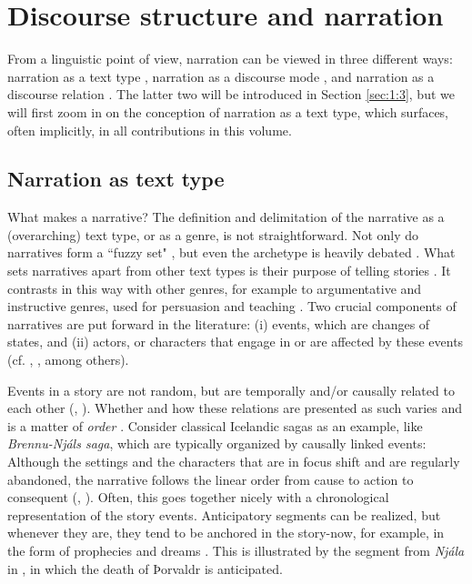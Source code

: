 \documentclass[output=paper,colorlinks,citecolor=brown]{langscibook}
\begin{document}
\section{Discourse structure and narration}
From a linguistic point of view, narration can be viewed in three different ways: narration as a text type \citep{Labov1972}, narration as a discourse mode \citep{Smith2003}, and narration as a discourse relation \citep{AsherLascarides2003}. The latter two will be introduced in Section \ref{sec:1:3}, but we will first zoom in on the conception of narration as a text type, which surfaces, often implicitly, in all contributions in this volume.

\subsection{Narration as text type}\label{sec:1:2}
What makes a narrative? The definition and delimitation of the narrative as a (overarching) text type, or as a genre, is not straightforward. Not only do narratives form a ``fuzzy set" \citep[193]{Ryan2006}, but even the archetype is heavily debated \citep[e.g.,][]{Ryan2017}. What sets narratives apart from other text types is their purpose of telling stories \citep[e.g.,][]{Labov2013}. It contrasts in this way with other genres, for example to argumentative and instructive genres, used for persuasion and teaching \citep{Fludernik2000}. Two crucial components of narratives are put forward in the literature: (i) events, which are changes of states, and (ii) actors, or characters that engage in or are affected by these events (cf. \citealt{Bal1985}, \citealt[56]{virtanen2011}, among others).

Events in a story are not random, but are temporally and/or causally related to each other (\citealt[16--18]{RimmonKenan1983}, \citealt[903]{Sternberg1990}). Whether and how these relations are presented as such varies and is a matter of \textit{order} \citep{Genette1972, Genette1980}. Consider classical Icelandic sagas as an example, like \textit{Brennu-Njáls saga}, which are typically organized by causally linked events: Although the settings and the characters that are in focus shift and are regularly abandoned, the narrative follows the linear order from cause to action to consequent (\citealt[23]{Loennroth1976}, \citealt{Korecka2019}). Often, this goes together nicely with a chronological representation of the story events. Anticipatory segments can be realized, but whenever they are, they tend to be anchored in the story-now, for example, in the form of prophecies and dreams \citep[31--32]{Loennroth1976}. This is illustrated by the segment from \textit{Njála} in , in which the death of Þorvaldr is anticipated.
\end{document}
